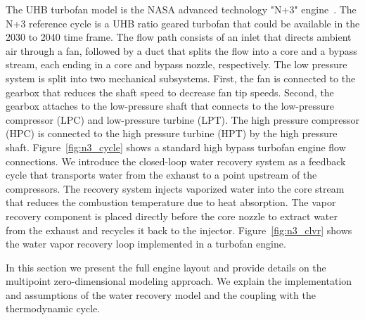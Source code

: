 \documentclass[conf]{new-aiaa}
\begin{document}
The UHB turbofan model is the NASA advanced technology "N+3" engine~\cite{Jones2017a}.
The N+3 reference cycle is a UHB ratio geared turbofan that could be available in the 2030 to 2040 time frame.
The flow path consists of an inlet that directs ambient air through a fan, followed by a duct that splits the flow into a core and a bypass stream, each ending in a core and bypass nozzle, respectively.
The low pressure system is split into two mechanical subsystems.
First, the fan is connected to the gearbox that reduces the shaft speed to decrease fan tip speeds.
Second, the gearbox attaches to the low-pressure shaft that connects to the low-pressure compressor (LPC) and low-pressure turbine (LPT).
The high pressure compressor (HPC) is connected to the high pressure turbine (HPT) by the high pressure shaft.
Figure~\ref{fig:n3_cycle} shows a standard high bypass turbofan engine flow connections.
We introduce the closed-loop water recovery system as a feedback cycle that transports water from the exhaust to a point upstream of the compressors.
The recovery system injects vaporized water into the core stream that reduces the combustion temperature due to heat absorption.
The vapor recovery component is placed directly before the core nozzle to extract water from the exhaust and recycles it back to the injector.
Figure~\ref{fig:n3_clvr} shows the water vapor recovery loop implemented in a turbofan engine.

In this section we present the full engine layout and provide details on the multipoint zero-dimensional modeling approach.
We explain the implementation and assumptions of the water recovery model and the coupling with the thermodynamic cycle.
\end{document}
